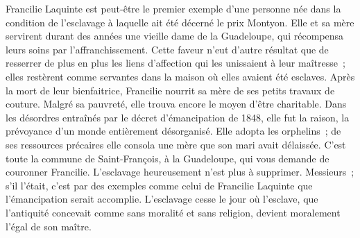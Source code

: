 \documentclass[french,twoside]{book} %
\newcommand\persName[1]{#1}
\newcommand\placeName[1]{#1}
\begin{document}
{\persName Francilie Laquinte} est peut-être le premier exemple d’une personne née dans la condition de l’esclavage à laquelle ait été décerné le prix Montyon. Elle et sa mère servirent durant des années une vieille dame de la {\placeName Guadeloupe}, qui récompensa leurs soins par l’affranchissement. Cette faveur n’eut d’autre résultat que de resserrer de plus en plus les liens d’affection qui les unissaient à leur maîtresse ; elles restèrent comme servantes dans la maison où elles avaient été esclaves. Après la mort de leur bienfaitrice, {\persName Francilie} nourrit sa mère de ses petits travaux de couture. Malgré sa pauvreté, elle trouva encore le moyen d’être charitable. Dans les désordres entraînés par le décret d’émancipation de 1848, elle fut la raison, la prévoyance d’un monde entièrement désorganisé. Elle adopta les orphelins ; de ses ressources précaires elle consola une mère que son mari avait délaissée. C’est toute la commune de {\placeName Saint-François}, à la {\placeName Guadeloupe}, qui vous demande de couronner {\persName Francilie}. L’esclavage heureusement n’est plus à supprimer. Messieurs ; s’il l’était, c’est par des exemples comme celui de {\persName Francilie Laquinte} que l’émancipation serait accomplie. L’esclavage cesse le jour où l’esclave, que l’antiquité concevait comme sans moralité et sans religion, devient moralement l’égal de son maître.\par
\end{document}
